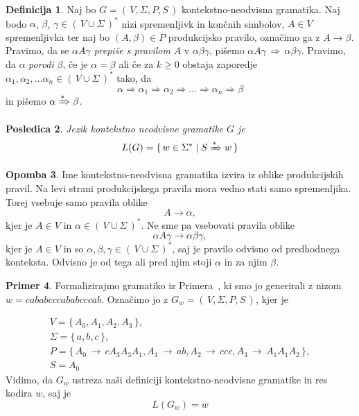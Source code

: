 \documentclass{amsart}
\theoremstyle{definition} %
\newtheorem{definicija}{Definicija}[section]
\newtheorem{primer}[definicija]{Primer}
\newtheorem{opomba}[definicija]{Opomba}
\theoremstyle{plain} %
\newtheorem{posledica}[definicija]{Posledica}
\begin{document}
\begin{definicija}
    
    Naj bo $ G = (\, V, \Sigma, P, S \,) $ kontekstno-neodvisna gramatika. Naj bodo $ \alpha $,
    $ \beta $, $ \gamma \in (\, V \cup \Sigma \,)^* $ nizi spremenljivk in končnih simbolov,
    $ A \in V $ spremenljivka ter naj bo $ ( A, \beta ) \in P $ produkcijsko pravilo,
    označimo ga z $ A \rightarrow \beta $. Pravimo, da se $ \alpha A \gamma $ 
    \textit{prepiše s pravilom} $ A $ v $ \alpha\beta\gamma $, pišemo $ \alpha A \gamma \, \Rightarrow \,
    \alpha\beta\gamma $. Pravimo, da $ \alpha $ \textit{porodi} $ \beta $, če je $ \alpha = \beta $ ali če
    za $ k \geq 0 $ obstaja zaporedje $ \alpha_1, \alpha_2, \ldots \alpha_n
    \in (\, V \cup \Sigma \,)^* $ tako, da 
    \[
        \alpha \Rightarrow \alpha_1 \Rightarrow \alpha_2 \Rightarrow \ldots \Rightarrow \alpha_n
        \Rightarrow \beta
    \]
    in pišemo $ \alpha \xRightarrow{*} \beta $.

\end{definicija}

\begin{posledica}

    Jezik kontekstno neodvisne gramatike $ G $ je
    \[
        L(G) = \{\, w \in \Sigma^* \mid S \xRightarrow{*} w \,\}
    \]

\end{posledica}

\begin{opomba}
    
    Ime kontekstno-neodvisna gramatika izvira iz oblike produkcijskih pravil. Na levi
    strani produkcijskega pravila mora vedno stati samo spremenljika. Torej vsebuje samo
    pravila oblike
    \[
        A \rightarrow \alpha,
    \]
    kjer je  $ A \in V $ in $ \alpha \in (\, V \cup \Sigma \,)^* $. Ne sme pa vsebovati
    pravila oblike
    \[
        \alpha A \gamma \rightarrow \alpha\beta\gamma,
    \]
    kjer je $ A \in V $ in so $ \alpha, \beta, \gamma \in (\, V \cup \Sigma \,)^* $, saj je
    pravilo odvisno od predhodnega konteksta. Odvisno je od tega ali pred njim stoji $ \alpha $
    in za njim $ \beta $.

\end{opomba}

\begin{primer}
    
    Formalizirajmo gramatiko iz Primera~, ki smo jo generirali z nizom
    $ w = cababcccababcccab $. Označimo jo z $ G_w = (\, V, \Sigma, P, S \,) $, kjer je 

    \begin{gather*}
         V = \{\, A_0, A_1, A_2, A_3 \,\}, \\
         \Sigma = \{\, a, b, c \,\}, \\
         P = \{\, A_0 \, \rightarrow \, cA_3A_3A_1, A_1 \, \rightarrow \, ab, A_2 \, 
        \rightarrow \, ccc, A_3 \, \rightarrow \, A_1A_1A_2 \,\}, \\
         S = A_0
    \end{gather*}
    Vidimo, da $ G_w $ ustreza naši definiciji kontekstno-neodvisne gramatike
    in res kodira $ w $, saj je 
    \[
        L(G_w) = w
    \]

\end{primer}
\end{document}
